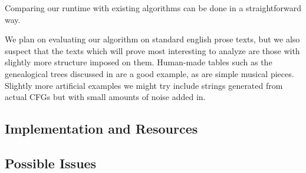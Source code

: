 \documentclass[11pt]{article}
\begin{document}
Comparing our runtime with existing algorithms can be done in a
straightforward way.

We plan on evaluating our algorithm on standard english prose texts, but
we also suspect that the texts which will prove most interesting to 
analyze are those with slightly more structure imposed on them. Human-made
tables such as the genealogical trees discussed in \cite{nevillphd} are a
good example, as are simple musical pieces. Slightly more artificial
examples we might try include strings generated from actual CFGs but with
small amounts of noise added in.

\subsection{Implementation and Resources}

\subsection{Possible Issues}

\nocite{*}


\end{document}
